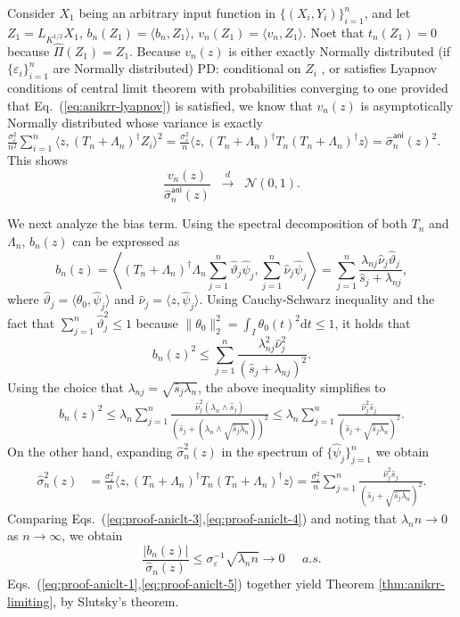 \documentclass[11pt,a4paper]{article}
\renewcommand{\hat}{\widehat}
\theoremstyle{definition}
\theoremstyle{plain}
\theoremstyle{remark}
\newcommand{\ud}{\mathrm d}
\newcommand{\ani}{\mathsf{ani}}
\newcommand{\pd}[1]{
	{ \color{blue} PD: #1}
}
\begin{document}
Consider $X_1$ being an arbitrary input function in $\{(X_i,Y_i)\}_{i=1}^n$,
and let $Z_1=L_{K^{1/2}}X_1$, $b_n(Z_1)=\langle b_n,Z_1\rangle$, $v_n(Z_1)=\langle v_n,Z_1\rangle$.
Noet that $t_n(Z_1)=0$ because $\hat\Pi(Z_1)=Z_1$.
Because $v_n(z)$ is either exactly Normally distributed (if $\{\varepsilon_i\}_{i=1}^n$ are Normally distributed) \pd{conditional on $Z_i$}, or satisfies Lyapnov conditions of central limit theorem with probabilities converging to one
provided that Eq.~(\ref{eq:anikrr-lyapnov}) is satisfied, we know that $v_n(z)$ is asymptotically Normally distributed whose variance is exactly $\frac{\sigma_\varepsilon^2}{n^2}\sum_{i=1}^n\langle z, (T_n+\Lambda_n)^{\dagger}Z_i\rangle^2 = \frac{\sigma_\varepsilon^2}{n}\langle z, (T_n+\Lambda_n)^{\dagger}T_n(T_n+\Lambda_n)^{\dagger}z\rangle=\hat\sigma_n^\ani(z)^2$. This shows
\begin{equation}
\frac{v_n(z)}{\hat\sigma_n^\ani(z)}\;\;\overset{d}{\to}\;\;\mathcal N(0,1).
\label{eq:proof-aniclt-2}
\end{equation}

We next analyze the bias term. Using the spectral decomposition of both $T_n$ and $\Lambda_n$, $b_n(z)$ can be expressed as
$$
b_n(z) = \left\langle(T_n+\Lambda_n)^{\dagger}\Lambda_n\sum_{j=1}^n\hat\vartheta_j\hat\psi_j, \sum_{j=1}^n\hat\nu_j\hat\psi_j\right\rangle = \sum_{j=1}^n\frac{\lambda_{nj}\hat\nu_j\hat\vartheta_j}{\hat s_j+\lambda_{nj}},
$$
where $\hat\vartheta_j=\langle\theta_0,\hat\psi_j\rangle$ and $\hat\nu_j = \langle z,\hat\psi_j\rangle$.
Using Cauchy-Schwarz inequality and the fact that $\sum_{j=1}^n\hat\vartheta_j^2\leq 1$ because $\|\theta_0\|_2^2 = \int_I\theta_0(t)^2\ud t\leq 1$, it holds that
$$
b_n(z)^2 \leq \sum_{j=1}^n\frac{\lambda_{nj}^2\hat\nu_j^2}{(\hat s_j+\lambda_{nj})^2}.
$$
Using the choice that $\lambda_{nj}= \sqrt{\hat s_j\lambda_n}$, the above inequality simplifies to
\begin{align}
b_n(z)^2 \leq \lambda_n\sum_{j=1}^n\frac{\hat\nu_j^2(\lambda_n\wedge\hat s_j)}{(\hat s_j+(\lambda_n\wedge\sqrt{\hat s_j\lambda_n}))^2}\leq \lambda_n\sum_{j=1}^n\frac{\hat\nu_j^2\hat s_j}{(\hat s_j+\sqrt{\hat s_j\lambda_n})^2}.
\label{eq:proof-aniclt-3}
\end{align}
On the other hand, expanding $\hat\sigma_n^2(z)$ in the spectrum of $\{\hat\psi_j\}_{j=1}^n$ we obtain
\begin{align}
\hat\sigma_n^2(z) &= \frac{\sigma_\varepsilon^2}{n}\langle z, (T_n+\Lambda_n)^{\dagger}T_n(T_n+\Lambda_n)^{\dagger}z\rangle = \frac{\sigma_\varepsilon^2}{n}\sum_{j=1}^n\frac{\hat\nu_j^2\hat s_j}{(\hat s_j+\sqrt{\hat s_j\lambda_n})^2}.
\label{eq:proof-aniclt-4}
\end{align}
Comparing Eqs.~(\ref{eq:proof-aniclt-3},\ref{eq:proof-aniclt-4}) and noting that $\lambda_n n\to0$ as $n\to\infty$, we obtain
\begin{equation}
\frac{|b_n(z)|}{\hat\sigma_n(z)} \leq \sigma_\varepsilon^{-1}\sqrt{\lambda_n n} \to 0\;\;\;\;\;a.s.
\label{eq:proof-aniclt-5}
\end{equation}
Eqs.~(\ref{eq:proof-aniclt-1},\ref{eq:proof-aniclt-5}) together yield Theorem \ref{thm:anikrr-limiting}, by Slutsky's theorem.
\end{document}
